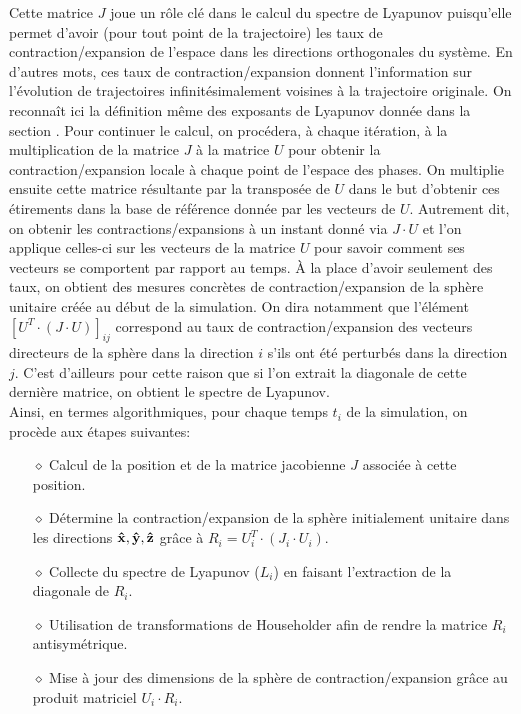     Cette matrice $J$ joue un rôle clé dans le calcul du spectre de Lyapunov puisqu'elle permet d'avoir (pour tout point de la trajectoire) les taux de contraction/expansion de l'espace dans les directions orthogonales du système. En d'autres mots, ces taux de contraction/expansion donnent l'information sur l'évolution de trajectoires infinitésimalement voisines à la trajectoire originale. On reconnaît ici la définition même des exposants de Lyapunov donnée dans la section . Pour continuer le calcul, on procédera, à chaque itération, à la multiplication de la matrice $J$ à la matrice $U$ pour obtenir la contraction/expansion locale à chaque point de l'espace des phases. On multiplie ensuite cette matrice résultante par la transposée de $U$ dans le but d'obtenir ces étirements dans la base de référence donnée par les vecteurs de $U$. Autrement dit, on obtenir les contractions/expansions à un instant donné via $J\cdot U$ et l'on applique celles-ci sur les vecteurs de la matrice $U$ pour savoir comment ses vecteurs se comportent par rapport au temps. À la place d'avoir seulement des taux, on obtient des mesures concrètes de contraction/expansion de la sphère unitaire créée au début de la simulation. On dira notamment que l'élément $[U^T\cdot(J\cdot U)]_{ij}$ correspond au taux de contraction/expansion des vecteurs directeurs de la sphère dans la direction $i$ s'ils ont été perturbés dans la direction $j$. C'est d'ailleurs pour cette raison que si l'on extrait la diagonale de cette dernière matrice, on obtient le spectre de Lyapunov. \\

    Ainsi, en termes algorithmiques, pour chaque temps $t_i$ de la simulation, on procède aux étapes suivantes: \\
    \begin{itemize}
        \item[$\diamond$] Calcul de la position et de la matrice jacobienne $J$ associée à cette position. \\
        \item[$\diamond$] Détermine la contraction/expansion de la sphère initialement unitaire dans les directions $\mathbf{\hat{x}}, \mathbf{\hat{y}}, \mathbf{\hat{z}}$ grâce à $R_i = U_i^T\cdot(J_i\cdot U_i)$. \\
        \item[$\diamond$] Collecte du spectre de Lyapunov ($L_i$) en faisant l'extraction de la diagonale de $R_i$. \\
        \item[$\diamond$] Utilisation de transformations de Householder afin de rendre la matrice $R_i$ antisymétrique. \\
        \item[$\diamond$] Mise à jour des dimensions de la sphère de contraction/expansion grâce au produit matriciel $U_i\cdot R_i$. \\
    \end{itemize}

